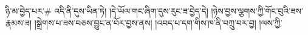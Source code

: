 ཉི་མ་བྱེད་པར་# འདི་ནི་དུས་ཡིན་ཏེ། །དེ་ཡོལ་གང་ཞིག་དུས་རུང་ཟ་བྱེད་དེ། །ཉེས་བྱས་ལྕགས་ཀྱི་གོང་བུའི་ཟས་རྣམས་ཟ། །སྒྲེགས་པ་ཟས་བཅས་བྱུང་ན་བོར་བྱས་ནས། །འབད་པ་དག་གིས་ཁ་ནི་བཀྲུ་བར་བྱ། །ལས་ཀྱི་%
